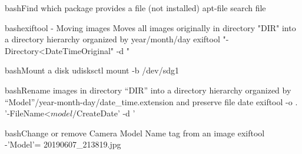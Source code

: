 \documentclass[10pt,a4paper]{article}
\begin{document}
\begin{multicols}{3}
\begin{codebox}{bash}{Find which package provides a file (not installed)}
apt-file search file

\end{codebox}

\begin{codebox}{bash}{exiftool - Moving images}
Moves all images originally in directory "DIR" into a directory hierarchy organized by year/month/day
exiftool "-Directory<DateTimeOriginal" -d "%

\end{codebox}

\begin{codebox}{bash}{Mount a disk}
udisksctl mount -b /dev/sdg1

\end{codebox}

\begin{codebox}{bash}{Rename images in directory ``DIR'' into a directory hierarchy organized by ``Model''/year-month-day/date\_time.extension and preserve file date}
exiftool -o . '-FileName<${model}/${CreateDate}' -d '%

\end{codebox}

\begin{codebox}{bash}{Change or remove Camera Model Name tag from an image}
exiftool -'Model'= 20190607_213819.jpg

\end{codebox}


\AtNextBibliography{\footnotesize}
\printbibliography  
\end{multicols}
\end{document}
